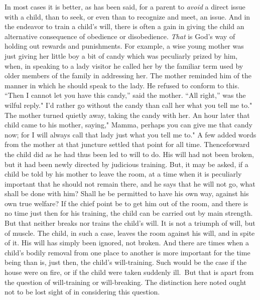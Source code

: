 \documentclass[
]{book}
\begin{document}
In most cases it is better, as has been said, for a parent to \emph{avoid} a direct issue with a child, than to seek, or even than to recognize and meet, an issue. And in the endeavor to train a child's will, there is often a gain in giving the child an alternative consequence of obedience or disobedience. \emph{That} is God's way of holding out rewards and punishments. For example, a wise young mother was just giving her little boy a bit of candy which was peculiarly prized by him, when, in speaking to a lady visitor he called her by the familiar term used by older members of the family in addressing her. The mother reminded him of the manner in which he should speak to the lady. He refused to conform to this. ``Then I cannot let you have this candy,'' said the mother. ``All right,'' was the wilful reply." I'd rather go without the candy than call her what you tell me to." The mother turned quietly away, taking the candy with her. An hour later that child came to his mother, saying," Mamma, perhaps you can give me that candy now; for I will always call that lady just what you tell me to." A few added words from the mother at that juncture settled that point for all time. Thenceforward the child did as he had thus been led to will to do. His will had not been broken, but it had been newly directed by judicious training. But, it may be asked, if a child be told by his mother to leave the room, at a time when it is peculiarly important that he should not remain there, and he says that he will not go, what shall be done with him? Shall he be permitted to have his own way, against his own true welfare? If the chief point be to get him out of the room, and there is no time just then for his training, the child can be carried out by main strength. But that neither breaks nor trains the child's will. It is not a triumph of will, but of muscle. The child, in such a case, leaves the room against his will, and in spite of it. His will has simply been ignored, not broken. And there are times when a child's bodily removal from one place to another is more important for the time being than is, just then, the child's will-training. Such would be the case if the house were on fire, or if the child were taken suddenly ill.~But that is apart from the question of will-training or will-breaking. The distinction here noted ought not to be lost sight of in considering this question.
\end{document}
